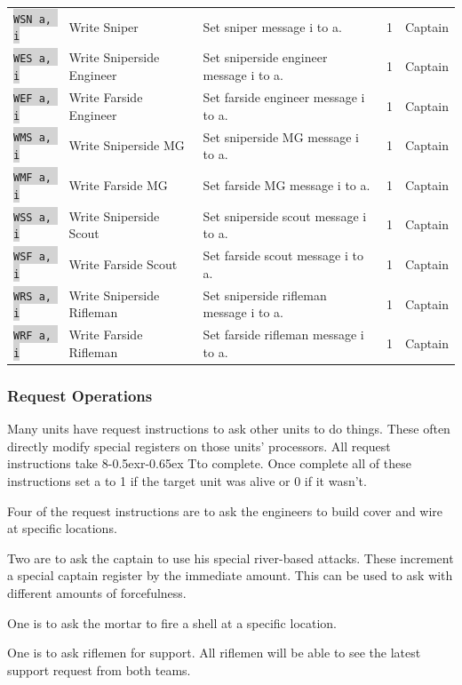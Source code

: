 \documentclass{article}
\newcommand{\vnscode}[1]{\colorbox{lightgray}{\lstinline[language=vns]{#1}}}
\newcommand{\RT}{\lower-0.5ex\hbox{r}\kern-0.65ex T}
\begin{document}
\begin{minipage}{\textwidth}
\begin{tabular}{lllll}
    \vnscode{WSN a, i} & Write Sniper & Set sniper message i to a. & 1 & Captain \\
    \vnscode{WES a, i} & Write Sniperside Engineer & Set sniperside engineer message i to a. & 1 & Captain \\
    \vnscode{WEF a, i} & Write Farside Engineer & Set farside engineer message i to a. & 1 & Captain \\
    \vnscode{WMS a, i} & Write Sniperside MG & Set sniperside MG message i to a. & 1 & Captain \\
    \vnscode{WMF a, i} & Write Farside MG & Set farside MG message i to a. & 1 & Captain \\
    \vnscode{WSS a, i} & Write Sniperside Scout & Set sniperside scout message i to a. & 1 & Captain \\
    \vnscode{WSF a, i} & Write Farside Scout & Set farside scout message i to a. & 1 & Captain \\
    \vnscode{WRS a, i} & Write Sniperside Rifleman & Set sniperside rifleman message i to a. & 1 & Captain \\
    \vnscode{WRF a, i} & Write Farside Rifleman & Set farside rifleman message i to a. & 1 & Captain \\
\end{tabular}
\end{minipage}


\subsubsection{Request Operations}

Many units have request instructions to ask other units to do things. These
often directly modify special registers on those units' processors. All request
instructions take 8\RT to complete. Once complete all of these instructions set
a to 1 if the target unit was alive or 0 if it wasn't.

Four of the request instructions are to ask the engineers to build cover and
wire at specific locations.

Two are to ask the captain to use his special river-based attacks. These
increment a special captain register by the immediate amount. This can be used
to ask with different amounts of forcefulness.

One is to ask the mortar to fire a shell at a specific location.

One is to ask riflemen for support. All riflemen will be able to see the latest
support request from both teams.
\end{document}
